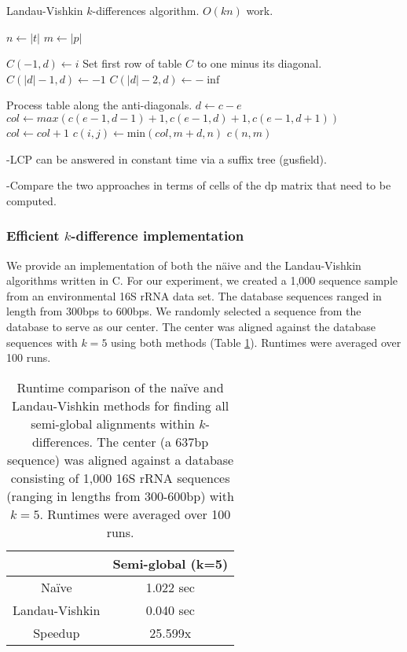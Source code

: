  \begin{algorithm}
 \caption{Landau-Vishkin $k$-differences algorithm. $O(kn)$ work.}\label{landau_vishkin}
 \begin{algorithmic}[1]
 \State $n\gets |t|$
 \State $m\gets |p|$

   \State $C(-1,d) \gets i$ \EndFor \Comment Set first row of table $C$ to one minus its diagonal. 
    \State $C(|d| - 1 ,d) \gets -1$
    \State $C(|d| - 2 ,d) \gets -\inf$
\EndFor

  \Comment Process table along the anti-diagonals.
  \State $d \gets c - e$
  \State $col \gets max(c(e-1,d-1) + 1,c(e-1,d)+ 1,c(e-1,d+1))$
    \State $col \gets col + 1$
  \EndWhile
  \State $c(i,j) \gets \text{min}(col, m + d, n)$
\EndFor
\EndFor
\Return $c(n,m)$
\EndProcedure
\end{algorithmic}
\end{algorithm}



-LCP can be answered in constant time via a suffix tree (gusfield).

-Compare the two approaches in terms of cells of the dp matrix that need to be computed.

\subsubsection{Efficient $k$-difference implementation}
We provide an implementation of both the n\"aive and the Landau-Vishkin algorithms written in C.
For our experiment, we created a 1,000 sequence sample from an environmental 16S rRNA data set.
The database sequences ranged in length from 300bps to 600bps.
We randomly selected a sequence from the database to serve as our center. 
The center was aligned against the database sequences with $k=5$ using both methods (Table \ref{table:naive_vishkin}).
Runtimes were averaged over 100 runs.

\begin{center}
\begin{table}[h]
\centering
\begin{tabular}{c|c}
               & Semi-global (k=5) \\
\hline 
Na\"ive          & 1.022 sec  \\
Landau-Vishkin & 0.040 sec \\
\hline 
Speedup        & 25.599x
\end{tabular}
\caption{Runtime comparison of the na\"ive and Landau-Vishkin\cite{landau_introducing_1986} methods for finding all semi-global alignments within $k$-differences. The center (a 637bp sequence) was aligned against a database consisting of 1,000 16S rRNA sequences (ranging in lengths from 300-600bp) with $k=5$.  Runtimes were averaged over 100 runs.}
\label{table:naive_vishkin}
\end{table}
\end{center}

